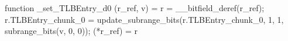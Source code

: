 function _set_TLBEntry_d0 (r_ref, v) = {
    r = __bitfield_deref(r_ref);
    r.TLBEntry_chunk_0 = update_subrange_bits(r.TLBEntry_chunk_0, 1, 1, subrange_bits(v, 0, 0));
    (*r_ref) = r
}
